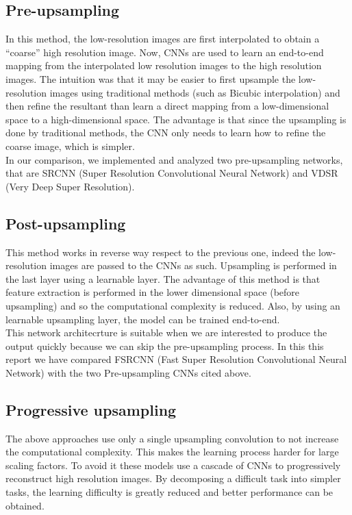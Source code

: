 \documentclass[10pt,twocolumn,letterpaper]{article}
\begin{document}
\subsection{Pre-upsampling}
	In this method, the low-resolution images are first interpolated to obtain a “coarse” high resolution image. Now, CNNs are used to learn an end-to-end mapping from the interpolated low resolution images to the high resolution images. The intuition was that it may be easier to first upsample the low-resolution images using traditional methods (such as Bicubic interpolation) and then refine the resultant than learn a direct mapping from a low-dimensional space to a high-dimensional space. The advantage is that since the upsampling is done by traditional methods, the CNN only needs to learn how to refine the coarse image, which is simpler.\\
	In our comparison, we implemented and analyzed two pre-upsampling networks, that are SRCNN \cite{dong2014image} (Super Resolution Convolutional Neural Network) and VDSR \cite{kim2015accurate} (Very Deep Super Resolution).
\subsection{Post-upsampling}
	This method works in reverse way respect to the previous one, indeed the low-resolution images are passed to the CNNs as such. Upsampling is performed in the last layer using a learnable layer. The advantage of this method is that feature extraction is performed in the lower dimensional space (before upsampling) and so the computational complexity is reduced. Also, by using an learnable upsampling layer, the model can be trained end-to-end.\\
	This network architecrture is suitable when we are interested to produce the output quickly because we can skip the pre-upsampling process.
	In this this report we have compared FSRCNN \cite{dong2016accelerating} (Fast Super Resolution Convolutional Neural Network) with the two Pre-upsampling CNNs cited above.
\subsection{Progressive upsampling}
The above approaches use only a single upsampling convolution to not increase the computational complexity. This makes the learning process harder for large scaling factors. To avoid it these models  use a cascade of CNNs to progressively reconstruct high resolution images. By decomposing a difficult task into simpler tasks, the learning difficulty is greatly reduced and better performance can be obtained.
\end{document}
